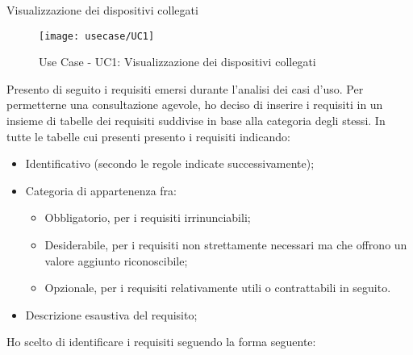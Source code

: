 \begin{usecase}{1}{Visualizzazione dei dispositivi collegati}
\label{uc:uc1}
\end{usecase}

\begin{figure}[!h]
    \centering
    \texttt{[image: usecase/UC1]}
    \caption{Use Case - UC1: Visualizzazione dei dispositivi collegati}
    \label{fig:uc1}
\end{figure}

Presento di seguito i requisiti emersi durante l’analisi dei casi d’uso.
Per permetterne una consultazione agevole, ho deciso di inserire i requisiti in un insieme di tabelle dei requisiti suddivise in base alla categoria degli stessi.
In tutte le tabelle cui presenti presento i requisiti indicando:
\begin{itemize}
	\item Identificativo (secondo le regole indicate successivamente);
	\item Categoria di appartenenza fra:
	\begin{itemize}
		\item Obbligatorio, per i requisiti irrinunciabili;
		\item Desiderabile, per i requisiti non strettamente necessari ma che offrono un
    valore aggiunto riconoscibile;
		\item Opzionale, per i requisiti relativamente utili o contrattabili in seguito.
	\end{itemize}
	\item Descrizione esaustiva del requisito;
\end{itemize}
\smallskip

\newenvironment{conditions}
  {\par\vspace{\abovedisplayskip}\noindent\begin{tabular}{>{$}l<{$} @{${}={}$} l}}
  {\end{tabular}\par\vspace{\belowdisplayskip}}

Ho scelto di identificare i requisiti seguendo la forma seguente:

